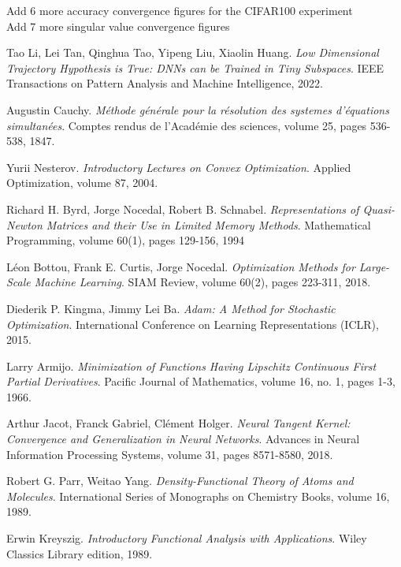\documentclass[11pt, a4paper]{article}
\begin{document}
Add 6 more accuracy convergence figures for the CIFAR100 experiment \\
Add 7 more singular value convergence figures

\pagebreak
\begin{thebibliography}{999}

 Tao Li, Lei Tan, Qinghua Tao, Yipeng Liu, Xiaolin Huang. \textit{Low Dimensional Trajectory Hypothesis is True: DNNs can be Trained in Tiny Subspaces}. IEEE Transactions on Pattern Analysis and Machine Intelligence, 2022.

 Augustin Cauchy. \textit{M\'{e}thode g\'{e}n\'{e}rale pour la r\'{e}solution des systemes d'\'{e}quations simultan\'{e}es}. Comptes rendus de l'Acad\'{e}mie des sciences, volume 25, pages 536-538, 1847.

 Yurii Nesterov. \textit{Introductory Lectures on Convex Optimization}. Applied Optimization, volume 87, 2004.

 Richard H. Byrd, Jorge Nocedal, Robert B. Schnabel. \textit{Representations of Quasi-Newton Matrices and their Use in Limited Memory Methods}. Mathematical Programming, volume 60(1), pages 129-156, 1994 

 L\'{e}on Bottou, Frank E. Curtis, Jorge Nocedal. \textit{Optimization Methods for Large-Scale Machine Learning}. SIAM Review, volume 60(2), pages 223-311, 2018.

 Diederik P. Kingma, Jimmy Lei Ba. \textit{Adam: A Method for Stochastic Optimization}. International Conference on Learning Representations (ICLR), 2015.

 Larry Armijo. \textit{Minimization of Functions Having Lipschitz Continuous First Partial Derivatives}. Pacific Journal of Mathematics, volume 16, no. 1, pages 1-3, 1966.

 Arthur Jacot, Franck Gabriel, Cl\'{e}ment Holger. \textit{Neural Tangent Kernel: Convergence and Generalization in Neural Networks}. Advances in Neural Information Processing Systems, volume 31, pages 8571-8580, 2018.

 Robert G. Parr, Weitao Yang. \textit{Density-Functional Theory of Atoms and Molecules}. International Series of Monographs on Chemistry Books, volume 16, 1989.

 Erwin Kreyszig. \textit{Introductory Functional Analysis with Applications}. Wiley Classics Library edition, 1989.


\end{thebibliography}
\end{document}
